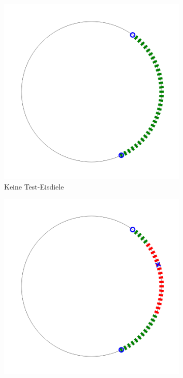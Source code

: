 \documentclass[a4paper,10pt,ngerman,captions=figureheading]{scrartcl}
\newcommand{\imageWidth}{0.3\linewidth}
\begin{document}
\begin{figure}[ht]
    \centering
    \caption{Test-Eisdielen Anordnung im Sektor}
    \begin{subfigure}[t]{\imageWidth}
        \includegraphics[width=\linewidth]{06_no_test_ice.png}
        \caption{Keine Test-Eisdiele}
        \label{fig:06_no_test_ice}
    \end{subfigure}
    \begin{subfigure}[t]{\imageWidth}
        \includegraphics[width=\linewidth]{07_one_test_ice.png}

\end{subfigure}
\end{figure}
\end{document}
